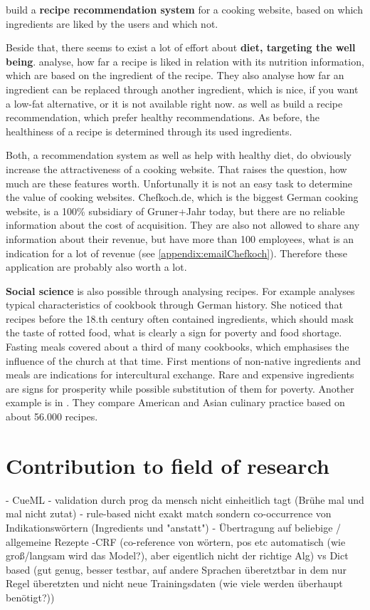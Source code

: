 \documentclass[12pt, twoside]{report}
\begin{document}
\parencite{recipeRecommendation} build a \textbf{recipe recommendation system} for a cooking website, based on which ingredients are liked by the users and which not.

Beside that, there seems to exist a lot of effort about \textbf{diet, targeting the well being}. \parencite{ingredientNetworks} analyse, how far a recipe is liked in relation with its nutrition information, which are based on the ingredient of the recipe. They also analyse how far an ingredient can be replaced through another ingredient, which is nice, if you want a low-fat alternative, or it is not available right now. \parencite{Freyne2010} as well as \parencite{Geleijnse_extractingvegetable} build a recipe recommendation, which prefer healthy recommendations. As before, the healthiness of a recipe is determined through its used ingredients.

Both, a recommendation system as well as help with healthy diet, do obviously increase the attractiveness of a cooking website. That raises the question, how much are these features worth. Unfortunally it is not an easy task to determine the value of cooking websites. Chefkoch.de, which is the biggest German cooking website, is a 100\% subsidiary of Gruner+Jahr today, but there are no reliable information about the cost of acquisition. They are also not allowed to share any information about their revenue, but have more than 100 employees, what is an indication for a lot of revenue (see \cref{appendix:emailChefkoch}). Therefore these application are probably also worth a lot.


\textbf{Social science} is also possible through analysing recipes. For example \parencite{BeateHenning} analyses typical characteristics of cookbook through German history. She noticed that recipes before the 18.th century often contained ingredients, which should mask the taste of rotted food, what is clearly a sign for poverty and food shortage. Fasting meals covered about a third of many cookbooks, which emphasises the influence of the church at that time. First mentions of non-native ingredients and meals are indications for intercultural exchange. Rare and expensive ingredients are signs for prosperity while possible substitution of them for poverty. Another example is in \parencite{FlavorNetwork}. They compare American and Asian culinary practice based on about 56.000 recipes.


\section{Contribution to field of research}
- CueML
	- validation durch prog da mensch nicht einheitlich tagt (Brühe mal und mal nicht zutat)
- rule-based nicht exakt match sondern co-occurrence von Indikationswörtern (Ingredients und "anstatt")
- Übertragung auf beliebige / allgemeine Rezepte
-CRF (co-reference von wörtern, pos etc automatisch (wie groß/langsam wird das Model?), aber eigentlich nicht der richtige Alg) vs Dict based (gut genug, besser testbar, auf andere Sprachen überetztbar in dem nur Regel überetzten und nicht neue Trainingsdaten (wie viele werden überhaupt benötigt?))
\end{document}
